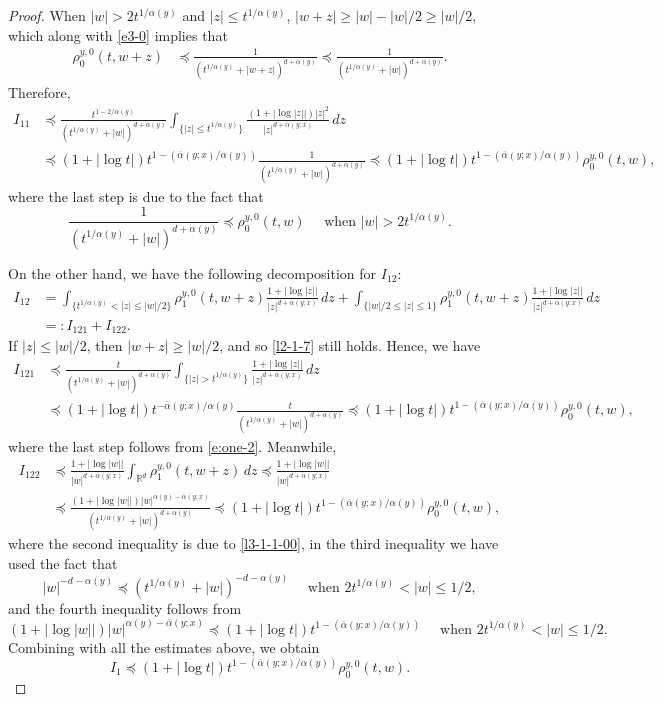 \documentclass[a4paper,11pt]{amsart}
\renewcommand{\le}{\leqslant}
\renewcommand{\ge}{\geqslant}
\newcommand{\R}{\mathds R}
\newcommand{\p}{\preceq}
\newcommand{\A}{\alpha}
\theoremstyle{definition}
\begin{document}
\begin{proof}
When $|w|>2t^{{1/\A(y)}}$ and $|z|\le t^{{1/\A(y)}}$,
$
|w{+} z|\ge |w|-{|w|}/{2}\ge {|w|}/{2},
$
which along with \eqref{e3-0} implies that
\begin{equation}\label{l2-1-7}
\begin{split}
\rho^{y,0}_0(t,w{+} z)&\p
\frac{1}{(t^{{1/\A(y)}}+|w{+} z|)^{d+\A(y)}}\p \frac{1}{(t^{{1/\A(y)}}+|w|)^{d+\A(y)}}.
\end{split}
\end{equation}
Therefore,
\begin{align*}
I_{11}&\p \frac{t^{1-{2}/{\A(y)}}}{(t^{{1/\A(y)}}+|w|)^{d+\A(y)}}
\int_{\{|z|\le t^{{1/\A(y)}}\}}\frac{(1+|\log |z||)|z|^2}{|z|^{d+\overline{\A}(y;x)}}\,dz\\
& \p (1+|\log t|)t^{1-({\overline\A(y;x)}/{\A(y)})}\frac{1}{(t^{{1/\A(y)}}+|w|)^{d+\A(y)}} \p (1+|\log t|)t^{1-({\overline
\A(y;x)}/{\A(y)})}\rho^{y,0}_0(t,w),
\end{align*}
where the last step is due to the fact that \begin{equation}\label{e:one-2}\frac{1}{(t^{{1/\A(y)}}+|w|)^{d+\A(y)}} \p \rho^{y,0}_0(t,w)\quad
\textrm{ when }|w|>2t^{{1/\A(y)}}.\end{equation}

On the other hand, we have the following decomposition for $I_{12}$:
\begin{align*}
I_{12}&=\int_{\{
t^{{1/\A(y)}}<|z|\le{|w|}/{2}\}}\rho^{y,0}_1(t,w{+} z)
\frac{1+|\log |z||}{|z|^{d+\overline{\A}(y;x)}}\,dz  + \int_{\{{|w|}/{2}\le |z|\le 1\}}\rho^{y,0}_1(t,w{+} z)
\frac{1+|\log |z||}{|z|^{d+\overline{\A}(y;x)}}\,dz\\
&=:I_{121}+I_{122}.
\end{align*}
If $|z|\le {|w|}/{2}$, then $|w{+} z|\ge {|w|}/{2}$,
and so \eqref{l2-1-7} still holds. Hence, we have
\begin{align*}
I_{121}&\p \frac{t}{(t^{{1/\A(y)}}+|w|)^{d+\A(y)}}
\int_{\{|z|>t^{{1/\A(y)}}\}}\frac{1+|\log |z||}{|z|^{d+\overline{\A}(y;x)}}\,dz\\
&\p (1+|\log t|)t^{-{\overline
\A(y;x)}/{\A(y)}}\frac{t}{(t^{{1/\A(y)}}+|w|)^{d+\A(y)}} \p (1+|\log t|)t^{1-({\overline
\A(y;x)}/{\A(y)})}\rho^{y,0}_0(t,w),
\end{align*} where the last step follows from \eqref{e:one-2}.
Meanwhile,
\begin{align*}
I_{122}&\p \frac{1+|\log|w||}{|w|^{d+\overline{\A}(y;x)}}\int_{\R^d}\rho^{y,0}_1(t,w{+} z)\,dz\p \frac{1+|\log|w||}{|w|^{d+\overline{\A}(y;x)}}\\
&\p \frac{(1+|\log|w||)|w|^{\A(y)-\overline{\A}(y;x)}}{(t^{{1/\A(y)}}+|w|)^{d+\A(y)}}\p (1+|\log t|)t^{1-({\overline{\A}(y;x)}/{\A(y)})}\rho^{y,0}_0(t,w),
\end{align*}
where the second inequality is due to \eqref{l3-1-1-00},
in the third inequality we have used the fact that $$|w|^{-d-\A(y)}\p
(t^{{1/\A(y)}}+|w|)^{-d-\A(y)}\quad \textrm{ when } 2t^{{1/\A(y)}}<|w|\le {1}/{2},$$ and the fourth
inequality follows from
$$ (1+|\log|w||)|w|^{\A(y)-\overline{\A}(y;x)}\p (1+|\log t|)t^{1-({\overline{\A}(y;x)}/{\A(y)})}
\quad\textrm{ when }2t^{{1/\A(y)}}<|w|\le {1}/{2}.$$
Combining with all the estimates above, we obtain
$$I_1\p (1+|\log t|)t^{1-({\overline{\A}(y;x)}/{\A(y)})}\rho^{y,0}_0(t,w).$$


\end{proof}
\end{document}
